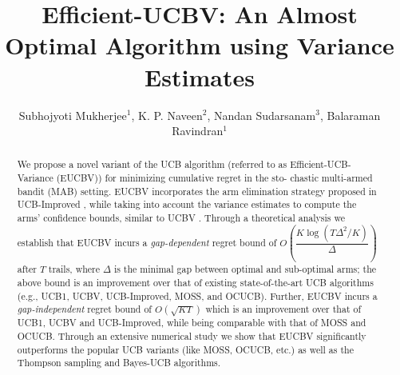 \documentclass{llncs}
\begin{document}
%
\frontmatter          %
%
\pagestyle{headings}  %

\mainmatter              %
%
\title{Efficient-UCBV: An Almost Optimal Algorithm using Variance Estimates}
%
%
\author{Subhojyoti Mukherjee${}^1$, K. P. Naveen${}^2$, Nandan
Sudarsanam${}^3$, Balaraman Ravindran${}^1$}
%
%
%

\maketitle              %

\begin{abstract}
We propose a novel variant of the UCB algorithm (referred to as Efficient-UCB-Variance (EUCBV)) for minimizing cumulative regret in the sto- chastic multi-armed bandit (MAB) setting. EUCBV incorporates the arm elimination strategy proposed in UCB-Improved \cite{auer2010ucb}, while taking into account the variance estimates to compute the arms' confidence bounds, similar to UCBV \cite{audibert2009exploration}. Through a theoretical analysis we establish that EUCBV incurs a \emph{gap-dependent} regret bound of {\scriptsize $O\left( \dfrac{K\log (T\Delta^2 /K)}{\Delta}\right)$} after $T$ trails, where $\Delta$ is the minimal gap between optimal and sub-optimal arms; the above bound is an improvement over that of existing state-of-the-art UCB algorithms (e.g.,  UCB1, UCBV, UCB-Improved, MOSS, and OCUCB). Further, EUCBV incurs a \emph{gap-independent} regret bound of {\scriptsize $O\left(\sqrt{KT}\right)$}  which is an improvement over that of UCB1, UCBV and UCB-Improved, while being comparable with that of MOSS and OCUCB. Through an extensive numerical study we show that EUCBV significantly outperforms the popular UCB variants (like MOSS, OCUCB, etc.) as well as the Thompson sampling and Bayes-UCB algorithms. 

\end{abstract}
\end{document}
